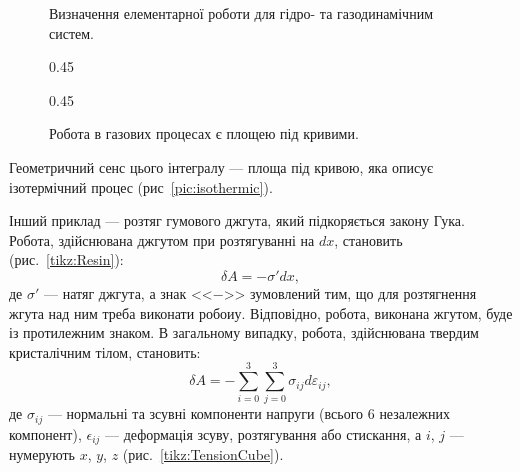 \begin{figure}[h!]\centering
	
	\caption{Визначення елементарної роботи для гідро- та газодинамічним систем.}
	\label{tikz:ElemWork}
\end{figure}

\begin{figure}[h!]\centering
	\begin{subcaptionblock}{0.45\linewidth}\centering
		
		\caption{Робота газу при ізотермічному процесі.}\label{pic:isothermic}
	\end{subcaptionblock}
	\begin{subcaptionblock}{0.45\linewidth}\centering
		
		\caption{Робота газу при ізобарному процесі.}\label{pic:isobaric}
	\end{subcaptionblock}
	\caption{Робота в газових процесах є площею під кривими.}
\end{figure}

Геометричний сенс цього інтегралу --- площа під кривою, яка описує ізотермічний процес
(рис~\ref{pic:isothermic}).

Інший приклад --- розтяг гумового джгута, який підкоряється закону Гука. Робота, здійснювана джгутом
при розтягуванні на $dx$, становить  (рис.~\ref{tikz:Resin}):
\begin{equation*}
	\delta A = -\sigma' dx,
\end{equation*}
де $\sigma'$ --- натяг джгута, а знак <<$-$>> зумовлений тим, що для розтягнення жгута над ним треба
виконати робоиу. Відповідно, робота, виконана жгутом, буде із протилежним знаком. В загальному
випадку,
робота, здійснювана твердим кристалічним тілом, становить:
\begin{equation*}
	\delta A = -\sum\limits_{i = 0}^{3}\sum\limits_{j = 0}^{3}\sigma_{ij}d\varepsilon_{ij},
\end{equation*}
де $\sigma_{ij}$ --- нормальні та зсувні компоненти напруги (всього 6 незалежних компонент),
$\epsilon_{ij}$ --- деформація зсуву, розтягування або стискання, а $i$, $j$ --- нумерують $x$, $y$,
$z$ (рис.~\ref{tikz:TensionCube}).

